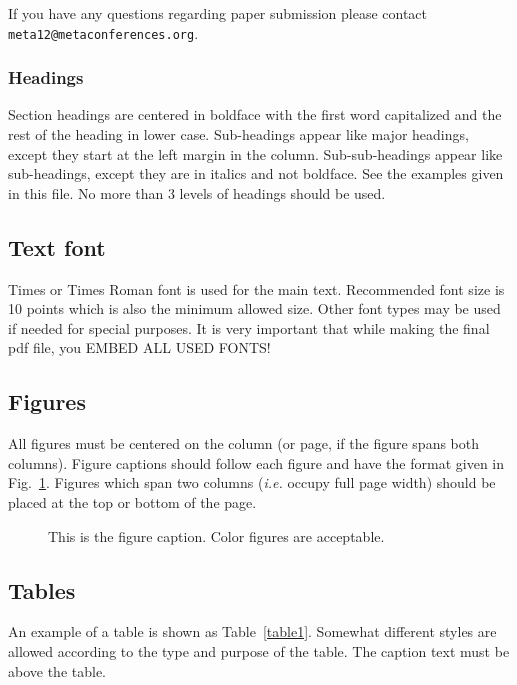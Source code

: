 \documentclass{article}
\begin{document}
If you have any questions regarding paper submission please contact {\tt \small meta12@metaconferences.org}. 

\subsubsection{Headings}

Section headings are centered in boldface with the first word capitalized and the rest of the heading in lower case. 
Sub-headings appear like major headings, except they start at the left margin in the column.
Sub-sub-headings appear like sub-headings, except they are in italics and not boldface. 
See the examples given in this  file. 
No more than 3 levels of headings should be used.

\subsection{Text font}

Times or Times Roman font is used for the main text. 
Recommended font size is 10 points which is also the minimum allowed size. 
Other font types may be used if needed for special purposes. 
It is very important that while making the final pdf file, you EMBED ALL USED FONTS!

\subsection{Figures}

All figures must be centered on the column (or page, if the figure spans both columns).
Figure captions should follow each figure and have the format given in  Fig.~\ref{fig:sin}.
Figures which span two columns ({\em i.e.} occupy full page width) should be placed at the top or bottom of the page.

\begin{figure}[t!]
\caption{This is the figure caption. Color figures are acceptable.}
\label{fig:sin}
\end{figure}

\subsection{Tables}

An example of a table is shown as Table~\ref{table1}. 
Somewhat different styles are allowed according to the type and purpose of the table. 
The caption text must be above the table.
\end{document}
